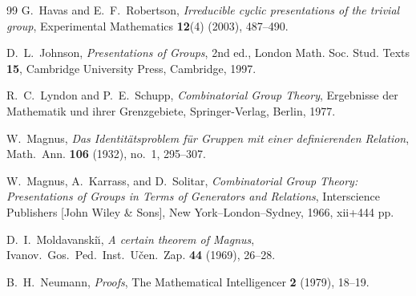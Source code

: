 \documentclass[a4paper,12pt,oneside]{article}
\theoremstyle{definition}
\begin{document}
\begin{thebibliography}{99}
G.~Havas and E.~F.~Robertson,
\emph{Irreducible cyclic presentations of the trivial group},
Experimental Mathematics \textbf{12}(4) (2003), 487--490.

D.~L.~Johnson,
\emph{Presentations of Groups},
2nd ed., London Math. Soc. Stud. Texts \textbf{15},
Cambridge University Press, Cambridge, 1997.

R.~C.~Lyndon and P.~E.~Schupp,
\emph{Combinatorial Group Theory},
Ergebnisse der Mathematik und ihrer Grenzgebiete,
Springer-Verlag, Berlin, 1977.

W.~Magnus,
\emph{Das Identit\"atsproblem f\"ur Gruppen mit einer definierenden Relation},
Math.~Ann. \textbf{106} (1932), no.~1, 295--307.

W.~Magnus, A.~Karrass, and D.~Solitar,
\emph{Combinatorial Group Theory: Presentations of Groups in Terms of
Generators and Relations},
Interscience Publishers [John Wiley \& Sons], New York--London--Sydney,
1966, xii+444 pp.

D.~I.~Moldavanski{\u{\i}},
\emph{A certain theorem of Magnus},
Ivanov.~Gos.~Ped.~Inst.~U\v cen.~Zap. \textbf{44} (1969), 26--28.

B.~H.~Neumann,
\emph{Proofs},
The Mathematical Intelligencer \textbf{2} (1979), 18--19.
\end{thebibliography}
\end{document}
